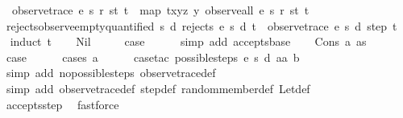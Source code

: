 \begin{isabellebody}
\ \ {\isachardoublequoteopen}observe{\isacharunderscore}trace\ e\ s\ r\ st\ t\ {\isasymequiv}\ map\ {\isacharparenleft}{\isasymlambda}{\isacharparenleft}t{\isacharcomma}x{\isacharcomma}y{\isacharcomma}z{\isacharparenright}{\isachardot}\ y{\isacharparenright}\ {\isacharparenleft}observe{\isacharunderscore}all\ e\ s\ r\ st\ t{\isacharparenright}{\isachardoublequoteclose}\isanewline
\isanewline
{}\isamarkupfalse%
\ rejects{\isacharunderscore}observe{\isacharunderscore}empty{\isacharunderscore}quantified{\isacharcolon}\ {\isachardoublequoteopen}{\isasymAnd}s\ d{\isachardot}\ rejects\ e\ s\ d\ t\ {\isasymlongrightarrow}\ observe{\isacharunderscore}trace\ e\ s\ d\ step\ t\ {\isacharequal}\ {\isacharbrackleft}{\isacharbrackright}{\isachardoublequoteclose}\isanewline
%
\isadelimproof
%
\endisadelimproof
%
\isatagproof
{}\isamarkupfalse%
{\isacharparenleft}induct\ t{\isacharparenright}\isanewline
\ \ \isamarkupfalse%
\ Nil\isanewline
\ \ \isamarkupfalse%
\ \isamarkupfalse%
\ {\isacharquery}case\isanewline
\ \ \ \ \isamarkupfalse%
\ {\isacharparenleft}simp\ add{\isacharcolon}\ accepts{\isachardot}base{\isacharparenright}\isanewline
{}\isamarkupfalse%
\isanewline
\ \ \isamarkupfalse%
\ {\isacharparenleft}Cons\ a\ as{\isacharparenright}\isanewline
\ \ \isamarkupfalse%
\ \isamarkupfalse%
\ {\isacharquery}case\isanewline
\ \ \ \ \isamarkupfalse%
\ {\isacharparenleft}cases\ a{\isacharparenright}\isanewline
\ \ \ \ \isamarkupfalse%
\ {\isacharparenleft}case{\isacharunderscore}tac\ {\isachardoublequoteopen}possible{\isacharunderscore}steps\ e\ s\ d\ aa\ b\ {\isacharequal}\ {\isacharbraceleft}{\isacharbar}{\isacharbar}{\isacharbraceright}{\isachardoublequoteclose}{\isacharparenright}\isanewline
\ \ \ \ \ \isamarkupfalse%
\ {\isacharparenleft}simp\ add{\isacharcolon}\ no{\isacharunderscore}possible{\isacharunderscore}steps{\isacharunderscore}{}\ observe{\isacharunderscore}trace{\isacharunderscore}def{\isacharparenright}\isanewline
\ \ \ \ \isamarkupfalse%
\ {\isacharparenleft}simp\ add{\isacharcolon}\ observe{\isacharunderscore}trace{\isacharunderscore}def\ step{\isacharunderscore}def\ random{\isacharunderscore}member{\isacharunderscore}def\ Let{\isacharunderscore}def{\isacharparenright}\isanewline
\ \ \ \ \isamarkupfalse%
\ accepts{\isachardot}step\ \isamarkupfalse%
\ fastforce\isanewline
{}\isamarkupfalse%

\end{isabellebody}
